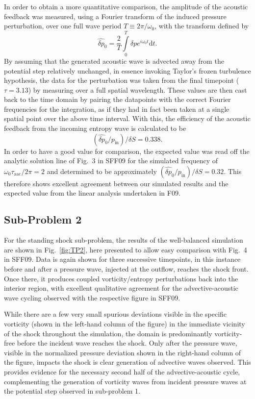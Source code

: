 In order to obtain a more quantitative comparison, the amplitude of the acoustic feedback was measured, using a Fourier transform of the induced pressure perturbation, over one full wave period $T\equiv2\pi/\omega_0$, with the transform defined by
\begin{equation}
\hat{\delta p}_0=\frac{2}{T}\int\limits_{0}^{T}\delta pe^{i\omega_0t}\textrm{d}t.
\end{equation}
By assuming that the generated acoustic wave is advected away from the potential step relatively unchanged, in essence invoking Taylor's frozen turbulence hypothesis, the data for the perturbation was taken from the final timepoint ($\tau=3.13$) by measuring over a full spatial wavelength. These values are then cast back to the time domain by pairing the datapoints with the correct Fourier frequencies for the integration, as if they had in fact been taken at a single spatial point over the above time interval. With this, the efficiency of the acoustic feedback from the incoming entropy wave is calculated to be $$\left(\hat{\delta p}_0/p_\textrm{in}\right)/\delta S=0.338.$$
In order to have a good value for comparison, the expected value was read off the analytic solution line of Fig.~3 in SFF09 for the simulated frequency of $\omega_0\tau_\textrm{aac}/2\pi=2$ and determined to be approximately $\left(\hat{\delta p}_0/p_\textrm{in}\right)/\delta S=0.32$. This therefore shows excellent agreement between our simulated results and the expected value from the linear analysis undertaken in F09.

\subsection{Sub-Problem 2}
\label{subsec:results_TP2}

For the standing shock sub-problem, the results of the well-balanced simulation are shown in Fig.~\ref{fig:TP2}, here presented to allow easy comparison with Fig.~4 in SFF09. Data is again shown for three successive timepoints, in this instance before and after a pressure wave, injected at the outflow, reaches the shock front. Once there, it produces coupled vorticity/entropy perturbations back into the interior region, with excellent qualitative agreement for the advective-acoustic wave cycling observed with the respective figure in SFF09.

While there are a few very small spurious deviations visible in the specific vorticity (shown in the left-hand column of the figure) in the immediate vicinity of the shock throughout the simulation, the domain is predominantly vorticity-free before the incident wave reaches the shock. Only after the pressure wave, visible in the normalized pressure deviation shown in the right-hand column of the figure, impacts the shock is clear generation of advective waves observed. This provides evidence for the necessary second half of the advective-acoustic cycle, complementing the generation of vorticity waves from incident pressure waves at the potential step observed in sub-problem 1.

